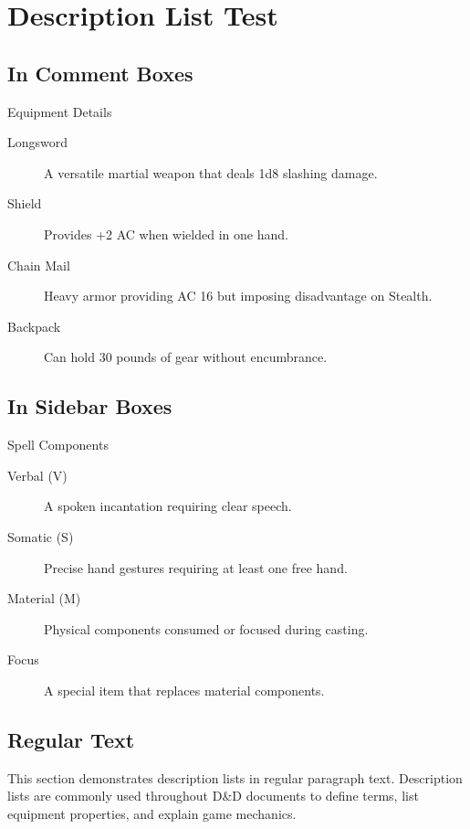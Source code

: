 \documentclass[letterpaper,twocolumn]{dndbook}
\begin{document}
\chapter{Description List Test}

\section{In Comment Boxes}

\begin{DndComment}{Equipment Details}
  \begin{description}
    \item[Longsword] A versatile martial weapon that deals 1d8 slashing damage.
    \item[Shield] Provides +2 AC when wielded in one hand.
    \item[Chain Mail] Heavy armor providing AC 16 but imposing disadvantage on Stealth.
    \item[Backpack] Can hold 30 pounds of gear without encumbrance.
  \end{description}
\end{DndComment}

\section{In Sidebar Boxes}

\begin{DndSidebar}{Spell Components}
  \begin{description}
    \item[Verbal (V)] A spoken incantation requiring clear speech.
    \item[Somatic (S)] Precise hand gestures requiring at least one free hand.
    \item[Material (M)] Physical components consumed or focused during casting.
    \item[Focus] A special item that replaces material components.
  \end{description}
\end{DndSidebar}

\section{Regular Text}

This section demonstrates description lists in regular paragraph text. Description lists are commonly used throughout D\&D documents to define terms, list equipment properties, and explain game mechanics.
\end{document}
